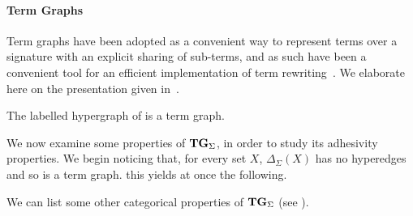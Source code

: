 \documentclass[3p]{elsarticle}
\newcommand{\catname}[1]{\textbf{\textup{#1}}}
\newcommand{\hyp}{\catname{Hyp}}
\newcommand{\tg}[0]{\catname{TG}_{\Sigma}}
\newcommand{\commentato}[1]{ {} }
\theoremstyle{remark}
\theoremstyle{definition}
\begin{document}
\color{black}
\paragraph{Term Graphs}\label{par:tg}
Term graphs have been adopted as a convenient way to represent terms over a signature with an explicit sharing of sub-terms,
and as such have been a convenient tool for an efficient implementation of term rewriting~\cite{Plu:TGR-ENTCS}.
We elaborate here on the presentation given in~\cite{CastelnovoGM24}.





\begin{exa}
The labelled hypergraph of  is a term graph.
\end{exa}


We now examine some properties of $\tg$, in order to study its adhesivity properties. We begin noticing that, for every set $X$,  $\Delta_\Sigma(X)$ has no hyperedges and so is a term graph. this yields at once the following.

\commentato{
\begin{proof}
	This follows noticing that $\Delta_{\Sigma}(X)$ is a term graph for every object $X$.
\end{proof}}

We can list some other categorical properties of $\tg$ (see \cite[Sec.~5]{CastelnovoGM24}).
\end{document}
